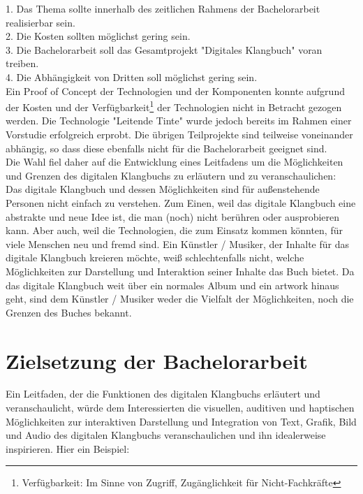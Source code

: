 1. Das Thema sollte innerhalb des zeitlichen Rahmens der Bachelorarbeit realisierbar sein.\\
2. Die Kosten sollten möglichst gering sein.\\
3. Die Bachelorarbeit soll das Gesamtprojekt "Digitales Klangbuch" voran treiben.\\
4. Die Abhängigkeit von Dritten soll möglichst gering sein.\\

Ein Proof of Concept der Technologien und der Komponenten konnte aufgrund der Kosten und der Verfügbarkeit\footnote{Verfügbarkeit: Im Sinne von Zugriff, Zugänglichkeit für Nicht-Fachkräfte} der Technologien nicht in Betracht gezogen werden. Die Technologie "Leitende Tinte" wurde jedoch bereits im Rahmen einer Vorstudie erfolgreich erprobt. Die übrigen Teilprojekte sind teilweise voneinander abhängig, so dass diese ebenfalls nicht für die Bachelorarbeit geeignet sind.\\

Die Wahl fiel daher auf die Entwicklung eines Leitfadens um die Möglichkeiten und Grenzen des digitalen Klangbuchs zu erläutern und zu veranschaulichen:\\
Das digitale Klangbuch und dessen Möglichkeiten sind für außenstehende Personen nicht einfach zu verstehen. Zum Einen, weil das digitale Klangbuch eine abstrakte und neue Idee ist, die man (noch) nicht berühren oder ausprobieren kann. Aber auch, weil die Technologien, die zum Einsatz kommen könnten, für viele Menschen neu und fremd sind. Ein Künstler / Musiker, der Inhalte für das digitale Klangbuch kreieren möchte, weiß schlechtenfalls nicht, welche Möglichkeiten zur Darstellung und Interaktion seiner Inhalte das Buch bietet. Da das digitale Klangbuch weit über ein normales Album und ein \gls{artwork} hinaus geht, sind dem Künstler / Musiker weder die Vielfalt der Möglichkeiten, noch die Grenzen des Buches bekannt.




\section{{Zielsetzung der Bachelorarbeit}}\label{einleitung_ziel}
Ein Leitfaden, der die Funktionen des digitalen Klangbuchs erläutert und veranschaulicht, würde dem Interessierten die visuellen, auditiven und haptischen Möglichkeiten zur interaktiven Darstellung und Integration von Text, Grafik, Bild und Audio des digitalen Klangbuchs veranschaulichen und ihn idealerweise inspirieren. Hier ein Beispiel:\\

